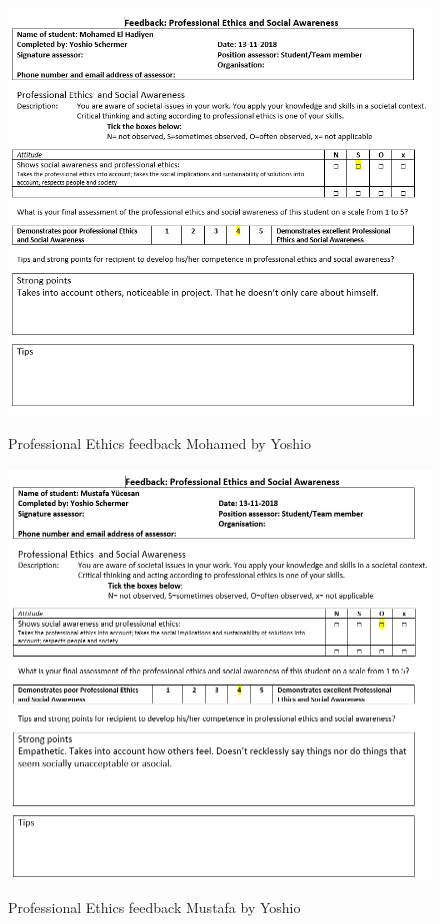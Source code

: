 \documentclass[12pt]{article}
\begin{document}
	\begin{figure}[p!]
		\centering
		\includegraphics[width=\columnwidth]{ProfEthMohamed3.PNG}\\
		\caption{Professional Ethics feedback Mohamed by Yoshio}
	\end{figure}
	\begin{figure}[p!]
		\centering
		\includegraphics[width=\columnwidth]{ProfEthMustafa3.PNG}\\
		\caption{Professional Ethics feedback Mustafa by Yoshio}
	\end{figure}
\end{document}
